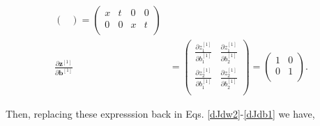 \documentclass{article}
\begin{document}
\begin{align}
\begin{pmatrix}
\end{pmatrix} =
\begin{pmatrix}
x & t & 0 & 0 \\
0 & 0 & x & t \\
\end{pmatrix} \\
\frac{\partial \textbf{z}^{[1]}}{\partial \textbf{b}^{[1]}} &=
\begin{pmatrix}
\frac{\partial z_1^{[1]}}{\partial b_1^{[1]}} & 
\frac{\partial z_1^{[1]}}{\partial b_2^{[1]}} \\
\frac{\partial z_2^{[1]}}{\partial b_1^{[1]}} & 
\frac{\partial z_2^{[1]}}{\partial b_2^{[1]}} \\
\end{pmatrix} =
\begin{pmatrix}
1 & 0 \\
0 & 1 \\
\end{pmatrix}.
\end{align}

Then, replacing these expresssion back in Eqs. \eqref{dJdw2}-\eqref{dJdb1} we have,
\end{document}
